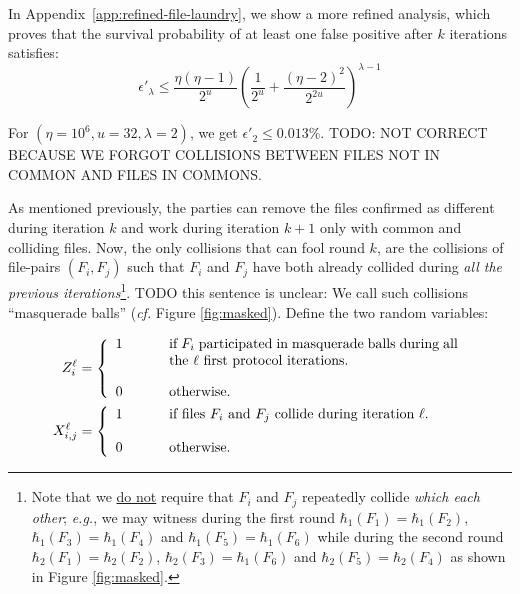 \documentclass[11pt]{llncs}
\newcommand{\cf}{\textit{cf.}\xspace}
\newcommand{\eg}{\textit{e.g.}\xspace}
\begin{document}
In Appendix~\ref{app:refined-file-laundry}, we show a more refined analysis, which proves that  the survival probability of at least one false positive after $k$ iterations satisfies:
\[
\epsilon'_\lambda \le \frac{\eta(\eta-1)}{2^u} \left( \frac{1}{2^u} + \frac{(\eta-2)^2}{2^{2u}} \right)^{\lambda-1}
\]

For $(\eta=10^6,u=32,\lambda=2)$, we get $\epsilon'_2 \le 0.013\%$.
TODO: NOT CORRECT BECAUSE WE FORGOT COLLISIONS BETWEEN FILES NOT IN COMMON AND FILES IN COMMONS.

As mentioned previously, the parties can remove the files confirmed as different during iteration $k$ and work during iteration $k+1$ only with common and colliding files. Now, the only collisions that can fool round $k$, are the collisions of file-pairs $(F_i,F_j)$ such that $F_i$ and $F_j$ have both already collided during \textit{all the previous iterations}\footnote{Note that we \underline{do not} require that $F_i$ and $F_j$ repeatedly collide \textit{which each other}; \eg, we may witness during the first round $\hbar_{1}(F_1)=\hbar_{1}(F_2)$, $\hbar_{1}(F_3)=\hbar_{1}(F_4)$ and $\hbar_{1}(F_5)=\hbar_{1}(F_6)$ while during the second round $\hbar_{2}(F_1)=\hbar_2(F_2)$, $\hbar_{2}(F_3)=\hbar_{1}(F_6)$ and $\hbar_{2}(F_5)=\hbar_{2}(F_4)$ as shown in Figure \ref{fig:masked}.}. TODO this sentence is unclear: We call such collisions ``masquerade balls'' (\cf Figure \ref{fig:masked}). Define the two random variables:

\begin{align*}
Z^\ell_i &=
\left\{
\begin{array}{lcl}
1 & ~~~~&  \parbox[t]{0.6\textwidth}{if $F_i$ participated in masquerade balls during all the $\ell$ first protocol iterations.}\\
\\
0 & ~~~~&  \mbox{otherwise.}
\end{array}
\right. \\
X^{\ell}_{i,j} &=
\left\{
\begin{array}{lcl}
1 & ~~~~&  \parbox[t]{0.6\textwidth}{if files $F_i$ and $F_j$ collide during iteration $\ell$.}\\
\\
0 & ~~~~&  \mbox{otherwise.}
\end{array}
\right.
\end{align*}

\def\bruijn{file $F_1$,file $F_2$,file $F_3$,file $F_4$,file $F_5$,file $F_6$}
\end{document}
